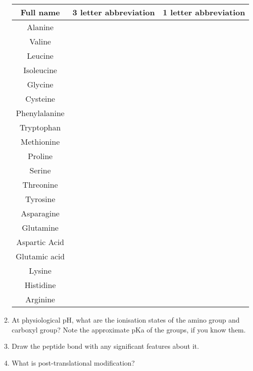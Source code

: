 \begin{enumerate}
\begin{tabular}{|c|c|c|}
\hline
\textbf{Full name} &\textbf {3 letter abbreviation} & \textbf{1 letter abbreviation}\\
\hline
Alanine & & \\
\hline
Valine & & \\
\hline
Leucine & & \\
\hline
Isoleucine& & \\
\hline
Glycine& & \\
\hline
Cysteine& & \\
\hline
Phenylalanine& & \\
\hline
Tryptophan& & \\
\hline
Methionine& & \\
\hline
Proline& & \\
\hline
Serine& & \\
\hline
Threonine& & \\
\hline
Tyrosine& & \\
\hline
Asparagine& & \\
\hline
Glutamine& & \\
\hline
Aspartic Acid& & \\
\hline
Glutamic acid& & \\
\hline
Lysine& & \\
\hline
Histidine& & \\
\hline
Arginine& & \\
\hline

\end{tabular}

\item At physiological pH, what are the ionisation states of the amino group and carboxyl group? Note the approximate pKa of the groups, if you know them.


\item Draw the peptide bond with any significant features about it.

\item What is post-translational modification?



\end{enumerate}
